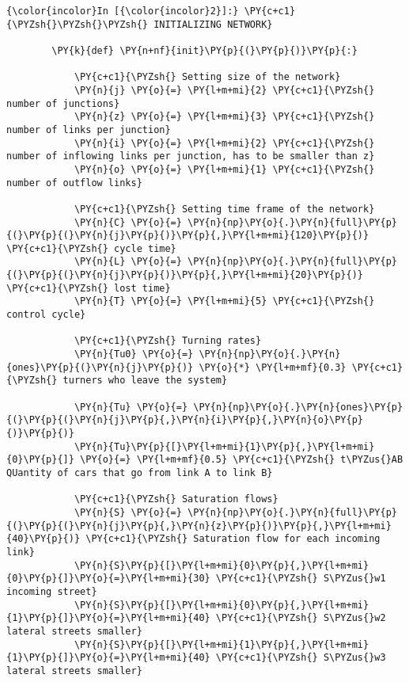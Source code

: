     \begin{Verbatim}[commandchars=\\\{\}]
{\color{incolor}In [{\color{incolor}2}]:} \PY{c+c1}{\PYZsh{}\PYZsh{}\PYZsh{} INITIALIZING NETWORK}
        
        \PY{k}{def} \PY{n+nf}{init}\PY{p}{(}\PY{p}{)}\PY{p}{:}
        
            \PY{c+c1}{\PYZsh{} Setting size of the network}
            \PY{n}{j} \PY{o}{=} \PY{l+m+mi}{2} \PY{c+c1}{\PYZsh{} number of junctions}
            \PY{n}{z} \PY{o}{=} \PY{l+m+mi}{3} \PY{c+c1}{\PYZsh{} number of links per junction}
            \PY{n}{i} \PY{o}{=} \PY{l+m+mi}{2} \PY{c+c1}{\PYZsh{} number of inflowing links per junction, has to be smaller than z}
            \PY{n}{o} \PY{o}{=} \PY{l+m+mi}{1} \PY{c+c1}{\PYZsh{} number of outflow links}
        
            \PY{c+c1}{\PYZsh{} Setting time frame of the network}
            \PY{n}{C} \PY{o}{=} \PY{n}{np}\PY{o}{.}\PY{n}{full}\PY{p}{(}\PY{p}{(}\PY{n}{j}\PY{p}{)}\PY{p}{,}\PY{l+m+mi}{120}\PY{p}{)} \PY{c+c1}{\PYZsh{} cycle time}
            \PY{n}{L} \PY{o}{=} \PY{n}{np}\PY{o}{.}\PY{n}{full}\PY{p}{(}\PY{p}{(}\PY{n}{j}\PY{p}{)}\PY{p}{,}\PY{l+m+mi}{20}\PY{p}{)} \PY{c+c1}{\PYZsh{} lost time}
            \PY{n}{T} \PY{o}{=} \PY{l+m+mi}{5} \PY{c+c1}{\PYZsh{} control cycle}
        
            \PY{c+c1}{\PYZsh{} Turning rates}
            \PY{n}{Tu0} \PY{o}{=} \PY{n}{np}\PY{o}{.}\PY{n}{ones}\PY{p}{(}\PY{n}{j}\PY{p}{)} \PY{o}{*} \PY{l+m+mf}{0.3} \PY{c+c1}{\PYZsh{} turners who leave the system}
        
            \PY{n}{Tu} \PY{o}{=} \PY{n}{np}\PY{o}{.}\PY{n}{ones}\PY{p}{(}\PY{p}{(}\PY{n}{j}\PY{p}{,}\PY{n}{i}\PY{p}{,}\PY{n}{o}\PY{p}{)}\PY{p}{)}
            \PY{n}{Tu}\PY{p}{[}\PY{l+m+mi}{1}\PY{p}{,}\PY{l+m+mi}{0}\PY{p}{]} \PY{o}{=} \PY{l+m+mf}{0.5} \PY{c+c1}{\PYZsh{} t\PYZus{}AB QUantity of cars that go from link A to link B}
        
            \PY{c+c1}{\PYZsh{} Saturation flows}
            \PY{n}{S} \PY{o}{=} \PY{n}{np}\PY{o}{.}\PY{n}{full}\PY{p}{(}\PY{p}{(}\PY{n}{j}\PY{p}{,}\PY{n}{z}\PY{p}{)}\PY{p}{,}\PY{l+m+mi}{40}\PY{p}{)} \PY{c+c1}{\PYZsh{} Saturation flow for each incoming link}
            \PY{n}{S}\PY{p}{[}\PY{l+m+mi}{0}\PY{p}{,}\PY{l+m+mi}{0}\PY{p}{]}\PY{o}{=}\PY{l+m+mi}{30} \PY{c+c1}{\PYZsh{} S\PYZus{}w1 incoming street}
            \PY{n}{S}\PY{p}{[}\PY{l+m+mi}{0}\PY{p}{,}\PY{l+m+mi}{1}\PY{p}{]}\PY{o}{=}\PY{l+m+mi}{40} \PY{c+c1}{\PYZsh{} S\PYZus{}w2 lateral streets smaller}
            \PY{n}{S}\PY{p}{[}\PY{l+m+mi}{1}\PY{p}{,}\PY{l+m+mi}{1}\PY{p}{]}\PY{o}{=}\PY{l+m+mi}{40} \PY{c+c1}{\PYZsh{} S\PYZus{}w3 lateral streets smaller}
            

\end{Verbatim}
